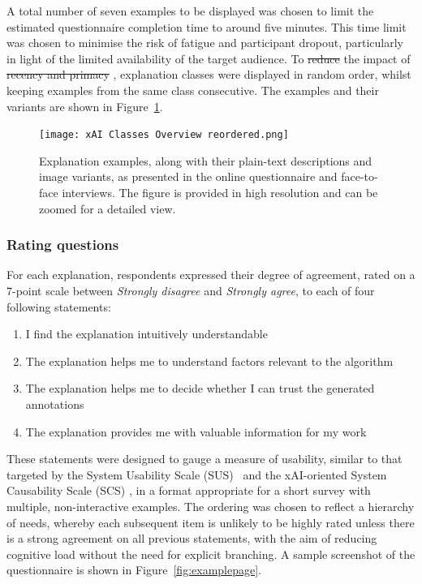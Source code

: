 \documentclass[final,5p,times,twocolumn,hyphens]{elsarticle}
\providecommand{\DIFaddtex}[1]{{\protect\color{blue}\uwave{#1}}} %
\providecommand{\DIFdeltex}[1]{{\protect\color{red}\sout{#1}}}                      %
\providecommand{\DIFaddbegin}{} %
\providecommand{\DIFaddend}{} %
\providecommand{\DIFdelbegin}{} %
\providecommand{\DIFdelend}{} %
\providecommand{\DIFadd}[1]{\texorpdfstring{\DIFaddtex{#1}}{#1}} %
\providecommand{\DIFdel}[1]{\texorpdfstring{\DIFdeltex{#1}}{}} %
\newcommand{\DIFscaledelfig}{0.5}
\newlength{\DIFdelgraphicswidth} %
\newlength{\DIFdelgraphicsheight} %
\newcommand{\DIFaddincludegraphics}[2][]{{\color{blue}\fbox{\DIFOincludegraphics[#1]{#2}}}} %
\newcommand{\DIFdelincludegraphics}[2][]{%
\sbox{\DIFdelgraphicsbox}{\DIFOincludegraphics[#1]{#2}}%
\settoboxwidth{\DIFdelgraphicswidth}{\DIFdelgraphicsbox} %
\settoboxtotalheight{\DIFdelgraphicsheight}{\DIFdelgraphicsbox} %
\scalebox{\DIFscaledelfig}{%
\parbox[b]{\DIFdelgraphicswidth}{\usebox{\DIFdelgraphicsbox}\\[-\baselineskip] \rule{\DIFdelgraphicswidth}{0em}}\llap{\resizebox{\DIFdelgraphicswidth}{\DIFdelgraphicsheight}{%
\setlength{\unitlength}{\DIFdelgraphicswidth}%
\begin{picture}(1,1)%
\thicklines\linethickness{2pt} %
{\color[rgb]{1,0,0}\put(0,0){\framebox(1,1){}}}%
{\color[rgb]{1,0,0}\put(0,0){\line( 1,1){1}}}%
{\color[rgb]{1,0,0}\put(0,1){\line(1,-1){1}}}%
\end{picture}%
}\hspace*{3pt}}} %
} %
\DeclareRobustCommand{\DIFaddbegin}{\DIFOaddbegin \let\includegraphics\DIFaddincludegraphics} %
\DeclareRobustCommand{\DIFaddend}{\DIFOaddend \let\includegraphics\DIFOincludegraphics} %
\DeclareRobustCommand{\DIFdelbegin}{\DIFOdelbegin \let\includegraphics\DIFdelincludegraphics} %
\DeclareRobustCommand{\DIFdelend}{\DIFOaddend \let\includegraphics\DIFOincludegraphics} %
\begin{document}
A total number of seven examples to be displayed was chosen to limit the estimated questionnaire completion time to around five minutes. This time limit was chosen to minimise the risk of fatigue and participant dropout, particularly in light of the limited availability of the target audience. To \DIFdelbegin \DIFdel{reduce }\DIFdelend \DIFaddbegin \DIFadd{mitigate }\DIFaddend the impact of \DIFdelbegin \DIFdel{recency and primacy }\DIFdelend \DIFaddbegin \DIFadd{primacy and recency}\DIFaddend , explanation classes were displayed in random order, whilst keeping examples from the same class consecutive. The examples and their variants are shown in Figure~\ref{fig:classes_overview}.

\begin{figure}
\centering
\begin{minipage}[c]{0.85\textwidth}
    \texttt{[image: xAI Classes Overview reordered.png]}
    \caption{Explanation examples, along with their plain-text descriptions and image variants, as presented in the online questionnaire and face-to-face interviews. The figure is provided in high resolution and can be zoomed for a detailed view.}
    \label{fig:classes_overview}
\end{minipage}
\end{figure}

\subsubsection{Rating questions}
 For each explanation, respondents expressed their degree of agreement, rated on a 7-point scale between \textit{Strongly disagree} and \textit{Strongly agree}, to each of four following statements:

 \begin{enumerate}
    \item I find the explanation intuitively understandable
    \item The explanation helps me to understand factors relevant to the algorithm
    \item The explanation helps me to decide whether I can trust the generated annotations
    \item The explanation provides me with valuable information for my work
\end{enumerate}

These statements were designed to gauge a measure of usability, similar to that targeted by the System Usability Scale (SUS)~\cite{brooke1996sus} and the xAI-oriented System Causability Scale (SCS) \cite{HolzingerEtAl:2020:QualityOfExplanations}, in a format appropriate for a short survey with multiple, non-interactive examples. The ordering was chosen to reflect a hierarchy of needs, whereby each subsequent item is unlikely to be highly rated unless there is a strong agreement on all previous statements, with the aim of reducing cognitive load without the need for explicit branching. A sample screenshot of the questionnaire is shown in Figure~\ref{fig:examplepage}.
\end{document}
